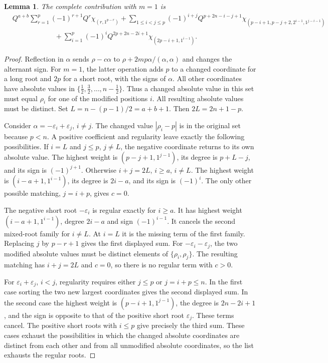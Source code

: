 \documentclass[11pt,a4paper]{amsart}
\numberwithin{equation}{section}
\newtheorem{lemma}[theorem]{Lemma}
\theoremstyle{definition}
\theoremstyle{remark}
\begin{document}
\begin{lemma}\label{B:uniform-mode-one}
The complete contribution with $m=1$ is
\begin{align*}
 &Q^{a+b}\sum_{r=1}^{p}(-1)^{r+1}Q^r\chi_{(r,1^{p-r})}+\sum_{1\leq i<j\leq p}(-1)^{i+j}
 Q^{p+2n-i-j+1}
 \chi_{(p-i+1,p-j+2,2^{i-1},1^{j-i-1})}\\
 &\qquad\qquad\qquad+\sum_{i=1}^{p}(-1)^iQ^{2p+2n-2i+1}
 \chi_{(2p-i+1,1^{i-1})}.
\end{align*}
\end{lemma}
\begin{proof}
Reflection in $\alpha$ sends $\rho-c\alpha$ to
$\rho+2mp\alpha/(\alpha,\alpha)$ and changes the alternant sign.
For $m=1$, the latter operation adds $p$ to a changed coordinate for
a long root and $2p$ for a short root, with the signs of $\alpha$.
All other coordinates have absolute values in
$\{\tfrac12,\tfrac32,\ldots,n-\tfrac12\}$. Thus a changed absolute
value in this set must equal $\rho_i$ for one of the modified
positions $i$. All resulting absolute values must be distinct.
Set $L=n-(p-1)/2=a+b+1$. Then $2L=2n+1-p$.

Consider $\alpha=-\varepsilon_i+\varepsilon_j$, $i\ne j$.
The changed value $|\rho_i-p|$ is in the original set because $p<n$.
A positive coefficient and regularity leave exactly the following
possibilities. If $i=L$ and $j\leq p$, $j\ne L$, the negative
coordinate returns to its own absolute value. The highest weight is
$(p-j+1,1^{j-1})$, its degree is $p+L-j$, and its sign is
$(-1)^{j+1}$. Otherwise $i+j=2L$, $i\geq a$, $i\ne L$. The highest
weight is $(i-a+1,1^{i-1})$, its degree is $2i-a$, and its sign is
$(-1)^i$. The only other possible matching, $j=i+p$, gives $c=0$.

The negative short root $-\varepsilon_i$ is regular exactly for
$i\geq a$. It has highest weight $(i-a+1,1^{i-1})$, degree $2i-a$
and sign $(-1)^{i-1}$. It cancels the second mixed-root family for
$i\ne L$. At $i=L$ it is the missing term of the first
family. Replacing $j$ by $p-r+1$ gives the first displayed sum.
For $-\varepsilon_i-\varepsilon_j$, the two modified absolute values
must be distinct elements of $\{\rho_i,\rho_j\}$. The resulting matching has
$i+j=2L$ and $c=0$, so there is no regular term with $c>0$.

For $\varepsilon_i+\varepsilon_j$, $i<j$, regularity requires either
$j\leq p$ or $j=i+p\leq n$. In the first case sorting the two new
largest coordinates gives the second displayed sum. In the second
case the highest weight is $(p-i+1,1^{j-1})$, the degree is
$2n-2i+1$, and the sign is opposite to that of the positive short
root $\varepsilon_j$. These terms cancel. The positive short roots
with $i\leq p$ give precisely the third sum.
These cases exhaust the possibilities in which the changed absolute
coordinates are distinct from each other and from all unmodified
absolute coordinates, so the list exhausts the regular roots.
\end{proof}
\end{document}
